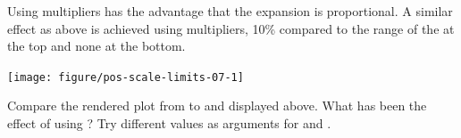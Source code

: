 \documentclass[krantz2]{krantz}\usepackage{knitr}
\begin{document}
\begin{knitrout}\footnotesize
{}\color{fgcolor}\begin{kframe}
\begin{alltt}
 \hlkwb{<-}
   \hlopt{+} \hlstd{(} \hlstd{=} \hlstd{(} \hlstd{=} \hlstd{(}\hlstd{,} \hlstd{)))}
\end{alltt}
\end{kframe}
\end{knitrout}

Using multipliers has the advantage that the expansion is proportional. A similar effect as above is achieved using multipliers, 10\% compared to the range of the  at the top and none at the bottom.

\begin{knitrout}\footnotesize
{}\color{fgcolor}\begin{kframe}
\begin{alltt}
 \hlkwb{<-}
   \hlopt{+} \hlstd{(} \hlstd{=} \hlstd{(} \hlstd{=} \hlstd{(}\hlstd{,} \hlstd{)))}
\end{alltt}
\end{kframe}
\end{knitrout}

\begin{knitrout}\footnotesize
{}\color{fgcolor}\begin{kframe}
\begin{alltt}
 \hlopt{+} 
\end{alltt}
\end{kframe}

{\centering \texttt{[image: figure/pos-scale-limits-07-1]} 

}


\end{knitrout}

\begin{playground}
Compare the rendered plot from  to  and  displayed above. What has been the effect of using ? Try different values as arguments for  and .
\end{playground}
\end{document}

